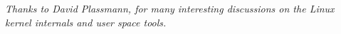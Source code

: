 \documentclass[a4paper,oneside]{book}
\begin{document}

\maketitle
\thispagestyle{first} %

\newpage

\thispagestyle{first} %

\vspace*{\fill}

\vspace{-1cm}

\begin{center}

\emph{Thanks to David Plassmann, for many interesting discussions on the Linux
kernel internals and user space tools.}

\end{center}

\vspace*{\fill}

\tableofcontents

\clearpage

\setcounter{chapter}{-1}







%

%









\appendix



\printglossaries
\end{document}
